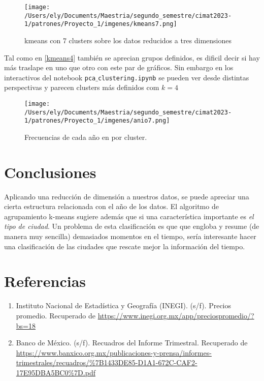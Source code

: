 \documentclass[letterpaper,spanish,reprint,nofootinbib,showkeys,aps]{revtex4-2}
\begin{document}
\begin{figure} [H]
	\begin{center}
		\texttt{[image: /Users/ely/Documents/Maestria/segundo\_semestre/cimat2023-1/patrones/Proyecto\_1/imgenes/kmeans7.png]}
		\caption{kmeans con 7 clusters sobre los datos reducidos a tres dimensiones}
		\label{kmeans7} 
   \end{center} 
\end{figure} 

Tal como en \ref{kmeans4} también se aprecian grupos definidos, es dificil decir si hay más traslape en uno que otro con este par de gráficos. Sin embargo en los interactivos del notebook \texttt{pca$\_$clustering.ipynb} se pueden ver desde distintas perspectivas y parecen clusters más definidos com $k=4$

\begin{figure} [H]
	\begin{center}
		\texttt{[image: /Users/ely/Documents/Maestria/segundo\_semestre/cimat2023-1/patrones/Proyecto\_1/imgenes/anio7.png]}
		\caption{Frecuencias de cada año en por cluster.}
		\label{anio7} 
   \end{center} 
\end{figure} 



\onecolumngrid
\section{Conclusiones}
Aplicando una reducción de dimensión a nuestros datos, se puede apreciar una cierta estructura relacionada con el año de los datos. El algoritmo de agrupamiento k-means sugiere además que si una característica importante es \textit{el tipo de ciudad}. Un problema de esta clasificación es que  que engloba y resume (de manera muy sencilla) demasiados momentos en el tiempo, sería interesante hacer una clasificación de las ciudades que rescate mejor la información del tiempo.

\onecolumngrid

\section*{Referencias}

\begin{enumerate}
    \item Instituto Nacional de Estadística y Geografía (INEGI). (s/f). Precios promedio. Recuperado de \url{https://www.inegi.org.mx/app/preciospromedio/?bs=18}
    
    \item Banco de México. (s/f). Recuadros del Informe Trimestral. Recuperado de \url{https://www.banxico.org.mx/publicaciones-y-prensa/informes-trimestrales/recuadros/%7B1433DE85-D1A1-672C-CAF2-17E95DBA5BC0%7D.pdf}
\end{enumerate}
\end{document}
